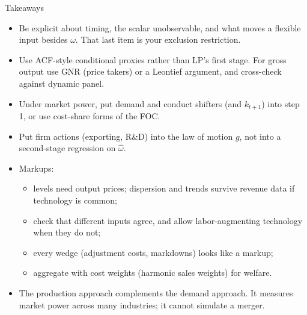 \documentclass[aspectratio=169,10pt]{beamer}
\begin{document}
\begin{frame}{Takeaways}
\begin{itemize}
\item Be explicit about \alert{timing}, the \alert{scalar unobservable}, and what moves a flexible input besides $\omega$. That last item is your exclusion restriction.
\item Use ACF-style conditional proxies rather than LP's first stage. For gross output use GNR (price takers) or a Leontief argument, and cross-check against dynamic panel.
\item Under market power, put demand and conduct shifters (and $k_{t+1}$) into step 1, or use cost-share forms of the FOC.
\item Put firm actions (exporting, R\&D) into the law of motion $g$, not into a second-stage regression on $\hat\omega$.
\item Markups:
\begin{itemize}
\item levels need output prices; dispersion and trends survive revenue data if technology is common;
\item check that different inputs agree, and allow labor-augmenting technology when they do not;
\item every wedge (adjustment costs, markdowns) looks like a markup;
\item aggregate with cost weights (harmonic sales weights) for welfare.
\end{itemize}
\item The production approach complements the demand approach. It measures market power across many industries; it cannot simulate a merger.
\end{itemize}
\end{frame}
\end{document}
